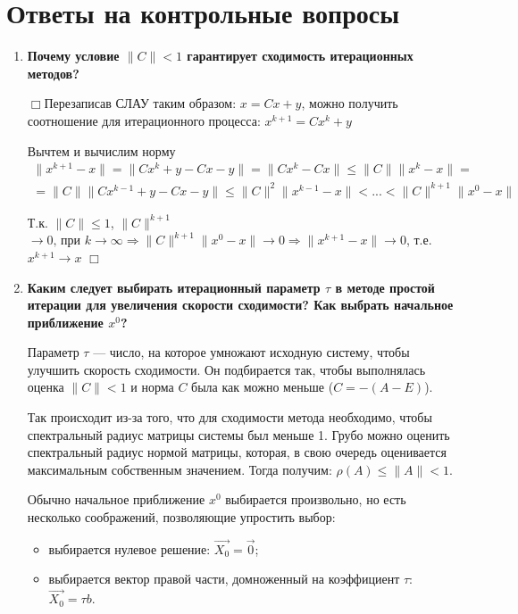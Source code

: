 \documentclass[12pt, a4paper]{article}
\begin{document}
	\section*{Ответы на контрольные вопросы}
	\begin{enumerate}
		\item\textbf{Почему условие $\|C\|<1$ гарантирует сходимость итерационных методов?}
		
		$\Box$Перезаписав СЛАУ таким образом: $x = Cx + y$, можно получить соотношение для итерационного процесса: $ x^{k+1} = Cx^k + y$  
		
		Вычтем и вычислим норму
		\begin{multline*}
			\|x^{k+1} - x \| = \|Cx^k + y - Cx - y\| = \|Cx^k - Cx \| \leqslant \|C\| \|x^k - x \| = \\
			= \|C\|  \|Cx^{k-1} + y - Cx - y\| \leqslant \|C\|^2 \|x^{k-1} - x \| < ... < \|C\|^{k+1} \|x^0 - x \| 
		\end{multline*}
		
		Т.к. $\|C\| \leqslant 1$, $\|C\|^{k+1}$ $\rightarrow 0 \text{, при $k \rightarrow \infty$} \Rightarrow \|C\|^{k+1} \|x^0 - x \|  \rightarrow 0 \Rightarrow \|x^{k+1} - x \| \rightarrow 0$, т.е. $x^{k+1} \rightarrow x$ $\Box$
		\item\textbf{Каким следует выбирать итерационный параметр $\tau$ в методе простой итерации для увеличения скорости сходимости? Как выбрать начальное приближение $x^0$?}
		
		Параметр $\tau$ --- число, на которое умножают исходную систему, чтобы улучшить скорость сходимости. Он подбирается так, чтобы выполнялась оценка $\|C\|<1$ и норма $C$ была как можно меньше ($C=-(A-E)$).
		
		Так происходит из-за того, что для сходимости метода необходимо, чтобы спектральный радиус матрицы системы был меньше 1. Грубо можно оценить спектральный радиус нормой матрицы, которая, в свою очередь оценивается максимальным собственным значением. Тогда получим: $\rho(A)\leq\|A\|<1$.
		
		Обычно начальное приближение $x^0$ выбирается произвольно, но есть несколько соображений, позволяющие упростить выбор:
		
		\begin{itemize}
			\item выбирается нулевое решение: $\vec{X_0}=\vec{0}$;
			\item выбирается вектор правой части, домноженный на коэффициент $\tau$: $\vec{X_0}=\tau b$.
		\end{itemize}
		

\end{enumerate}
\end{document}
